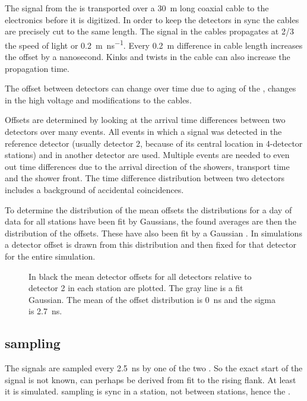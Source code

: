 The signal from the \pmt is transported over a \SI{30}{\meter} long
coaxial cable to the \hisparc electronics before it is digitized. In
order to keep the detectors in sync the cables are precisely cut to the
same length. The signal in the cables propagates at 2/3 the speed of
light or \SI{.2}{\meter\per\nano\second}. Every \SI{.2}{\meter}
difference in cable length increases the offset by a nanosecond. Kinks
and twists in the cable can also increase the propagation time.

The offset between detectors can change over time due to aging of the
\pmt, changes in the high voltage and modifications to the cables.

Offsets are determined by looking at the arrival time differences
between two detectors over many events. All events in which a signal was
detected in the reference detector (usually detector 2, because of its
central location in 4-detector stations) and in another detector are
used. Multiple events are needed to even out time differences due to the
arrival direction of the showers, transport time and the shower front.
The time difference distribution between two detectors includes a
background of accidental coincidences.

To determine the distribution of the mean offsets the distributions for
a day of data for all stations have been fit by Gaussians, the found
averages are then the distribution of the offsets. These have also been
fit by a Gaussian . In
simulations a detector offset is drawn from this distribution and then
fixed for that detector for the entire simulation.


\begin{figure}
    \centering
    
    \caption{ In black the mean
             detector offsets for all detectors relative to detector 2
             in each station are plotted. The gray line is a fit
             Gaussian. The mean of the offset distribution is
             \SI{0}{\nano\second} and the sigma is
             \SI{2.7}{\nano\second}.}
    \label{fig:detector_offset_distribution}
\end{figure}


\subsection{\adc sampling}

The \pmt signals are sampled every \SI{2.5}{\nano\second} by one of the
two \adcs. So the exact start of the signal is not known, can perhaps be
derived from fit to the rising flank. At least it is simulated. sampling
is sync in a station, not between stations, hence the \gps.
